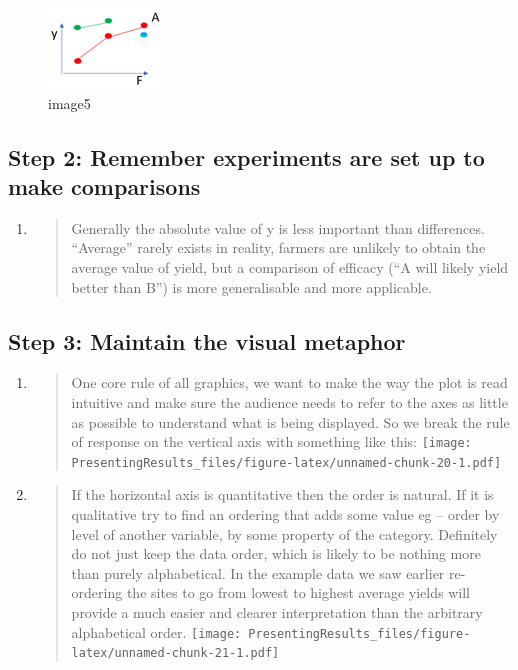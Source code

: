 \documentclass[
]{book}
\begin{document}
\begin{figure}
\centering
\includegraphics{img/Picture5.png}
\caption{image5}
\end{figure}

\hypertarget{step-2-remember-experiments-are-set-up-to-make-comparisons}{%
\subsection{Step 2: Remember experiments are set up to make comparisons}\label{step-2-remember-experiments-are-set-up-to-make-comparisons}}

\begin{enumerate}
\def\labelenumi{\alph{enumi}.}
\item
  \begin{quote}
  Generally the absolute value of y is less important than differences. ``Average'' rarely exists in reality, farmers are unlikely to obtain the average value of yield, but a comparison of efficacy (``A will likely yield better than B'') is more generalisable and more applicable.
  \end{quote}
\end{enumerate}

\hypertarget{step-3-maintain-the-visual-metaphor}{%
\subsection{Step 3: Maintain the visual metaphor}\label{step-3-maintain-the-visual-metaphor}}

\begin{enumerate}
\def\labelenumi{\alph{enumi}.}
\item
  \begin{quote}
  One core rule of all graphics, we want to make the way the plot is read intuitive and make sure the audience needs to refer to the axes as little as possible to understand what is being displayed. So we break the rule of response on the vertical axis with something like this:
  \texttt{[image: PresentingResults\_files/figure-latex/unnamed-chunk-20-1.pdf]}
  \end{quote}
\item
  \begin{quote}
  If the horizontal axis is quantitative then the order is natural. If it is qualitative try to find an ordering that adds some value eg -- order by level of another variable, by some property of the category. Definitely do not just keep the data order, which is likely to be nothing more than purely alphabetical. In the example data we saw earlier re-ordering the sites to go from lowest to highest average yields will provide a much easier and clearer interpretation than the arbitrary alphabetical order.
  \texttt{[image: PresentingResults\_files/figure-latex/unnamed-chunk-21-1.pdf]}
  \end{quote}
\end{enumerate}
\end{document}
